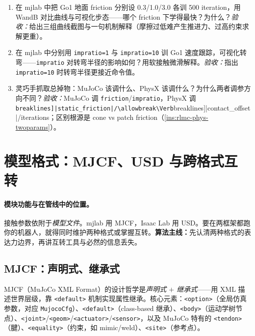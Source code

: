 \begin{practice}[本节练习]
\begin{enumerate}
  \item 在 mjlab 中把 Go1 地面 friction 分别设 0.3/1.0/3.0 各训 500 iteration，用 WandB 对比曲线与可视化步态——哪个 friction 下学得最快？为什么？\emph{验收：}给出三组曲线截图与一句机制解释（摩擦过低难产生推进力、过高约束求解更重）。
  \item 在 mjlab 中分别用 \verb|impratio=1| 与 \verb|impratio=10| 训 Go1 速度跟踪，可视化转弯——\verb|impratio| 对转弯半径的影响如何？用软接触微滑解释。\emph{验收：}指出 \verb|impratio=10| 时转弯半径更接近命令值。
  \item 灵巧手抓取总掉物：MuJoCo 该调什么、PhysX 该调什么？为什么两者调参方向不同？\emph{验收：}MuJoCo 调 \verb|friction|/\allowbreak\verb|impratio|，PhysX 调 \Verb[breaklines]|static_friction|/\allowbreak\Verb[breaklines]|contact_offset|/iterations；区别根源是 cone vs patch friction（\cref{ins:rlmc-phys-twoparams}）。
\end{enumerate}
\end{practice}

\section{模型格式：MJCF、USD 与跨格式互转}
\label{sec:rlmc-phys-format}

\paragraph{模块功能与在管线中的位置。}接触参数依附于\emph{模型文件}。mjlab 用 MJCF，Isaac Lab 用 USD。要在两框架都跑你的机器人，就得同时维护两种格式或掌握互转。\textbf{算法主线：}先认清两种格式的表达力边界，再讲互转工具与必然的信息丢失。

\subsection{MJCF：声明式、继承式}

MJCF（MuJoCo XML Format）的设计哲学是\emph{声明式 $+$ 继承式}——用 XML 描述世界层级，靠 \verb|<default>| 机制实现属性继承。核心元素：\verb|<option>|（全局仿真参数，对应 \verb|MujocoCfg|）、\verb|<default>|（class-based 继承）、\verb|<body>|（运动学树节点）、\verb|<joint>|/\allowbreak\verb|<geom>|/\allowbreak\verb|<actuator>|/\allowbreak\verb|<sensor>|，以及 MuJoCo 特有的 \verb|<tendon>|（腱）、\verb|<equality>|（约束，如 mimic/weld）、\verb|<site>|（参考点）。

